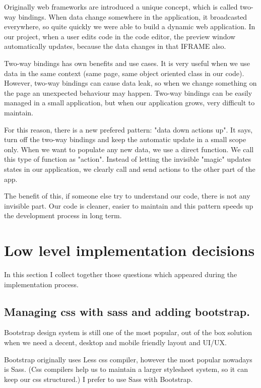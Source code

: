 \documentclass[12pt, a4paper, oneside, openright, medskipamount]{report}
\begin{document}
Originally web frameworks are introduced a unique concept, which is called two-way bindings. When data change somewhere in the application, it broadcasted everywhere, so quite quickly we were able to build a dynamic web application. In our project, when a user edits code in the code editor, the preview window automatically updates, because the data changes in that IFRAME also.

Two-way bindings has own benefits and use cases. It is very useful when we use data in the same context (same page, same object oriented class in our code). However, two-way bindings can cause data leak, so when we change something on the page an unexpected behaviour may happen. Two-way bindings can be easily managed in a small application, but when our application grows, very difficult to maintain.

For this reason, there is a new prefered pattern: "data down actions up". It says, turn off the two-way bindings and keep the automatic update in a small scope only. When we want to populate any new data, we use a direct function. We call this type of function as "action". Instead of letting the invisible "magic" updates states in our application, we clearly call and send actions to the other part of the app.

The benefit of this, if someone else try to understand our code, there is not any invisible part. Our code is cleaner, easier to maintain and this pattern speeds up the development process in long term.

\section{Low level implementation decisions}

In this section I collect together those questions which appeared during the implementation process.

\subsection{Managing css with sass and adding bootstrap.}

Bootstrap\cite{bootstrap} design system is still one of the most popular, out of the box solution when we need a decent, desktop and mobile friendly layout and UI/UX.

Bootstrap originally uses Less \cite{less} css compiler, however the most popular nowadays is Sass\cite{sass}. (Css compilers help us to maintain a larger stylesheet system, so it can keep our css structured.) I prefer to use Sass with Bootstrap.
\end{document}
